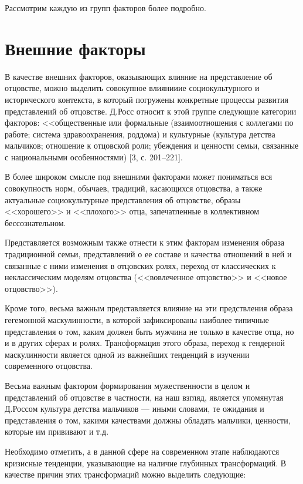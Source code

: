 \documentclass{../../common/thesisbyxetex}
\begin{document}
Рассмотрим каждую из групп факторов более подробно.

\section{Внешние факторы}

 В качестве внешних факторов, оказывающих влияние на представление об отцовстве, можно выделить 
совокупное влиянииие социокультурного и исторического контекста, в который погружены конкретные 
процессы развития представлений об  отцовстве. 
Д.Росс относит к этой группе следующие категории факторов: <<общественные или формальные 
(взаимоотношения
с коллегами по работе; система здравоохранения,
роддома) и культурные  (культура детства
мальчиков; отношение к отцовской роли; убеждения и ценности семьи, связанные с национальными 
особенностями) [3, с. 201–221].\cite[40]{otage}

В более широком смысле под внешними факторами может пониматься вся совокупность норм, обычаев, 
традиций, касающихся отцовства, а также 
актуальные социокультурные представления об отцовстве, образы <<хорошего>> и <<плохого>>
отца, запечатленные в коллективном бессознательном.

Представляется возможным также отнести к этим факторам изменения образа традиционной семьи, 
представлений о ее составе и качества отношений в ней и связанные с ними изменения в отцовских 
ролях, переход  от классических к неклассическим моделям отцовства (<<вовлеченное отцовство>> и 
<<новое отцовство>>).

Кроме того, весьма важным представляется влияние на эти предствления образа гегемонной 
маскулинности, в которой зафиксированы наиболее типичные представления о том, каким должен быть 
мужчина не только в качестве отца, но и в других сферах и ролях. Трансформация этого образа, 
переход к  гендерной маскулинности является одной из важнейших тенденций в изучении современного 
отцовства.

Весьма важным фактором формирования мужественности в целом и представлений об отцовстве в 
частности, на наш взгляд, является упомянутая Д.Россом культура детства мальчиков --- иными 
словами, те ожидания и представления о том, какими качествами должны обладать мальчики, ценности, 
которые им прививают и т.д.

Необходимо отметить, а в данной сфере на современном этапе наблюдаются  кризисные тенденции, 
указывающие на наличие глубинных трансформаций.
В качестве причин этих трансформаций можно выделить следующие:
\end{document}
